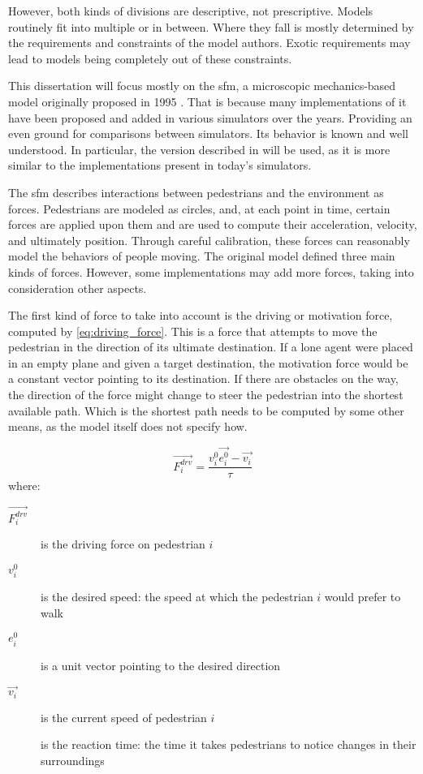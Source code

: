 \documentclass[twoside, 11pt]{article}
\begin{document}
However, both kinds of divisions are descriptive, not prescriptive. Models routinely fit into multiple or in between. Where they fall is mostly determined by the requirements and constraints of the model authors. Exotic requirements may lead to models being completely out of these constraints.

This dissertation will focus mostly on the \gls{sfm}, a microscopic mechanics-based model originally proposed in 1995 \cite{helbingSocialForceModel1995}. That is because many implementations of it have been proposed and added in various simulators over the years. Providing an even ground for comparisons between simulators. Its behavior is known and well understood. In particular, the version described in \cite{helbingSimulatingDynamicFeatures2000} will be used, as it is more similar to the implementations present in today's simulators.

The \gls{sfm} describes interactions between pedestrians and the environment as forces. Pedestrians are modeled as circles, and, at each point in time, certain forces are applied upon them and are used to compute their acceleration, velocity, and ultimately position. Through careful calibration, these forces can reasonably model the behaviors of people moving. The original model defined three main kinds of forces. However, some implementations may add more forces, taking into consideration other aspects.

The first kind of force to take into account is the driving or motivation force, computed by \autoref{eq:driving_force}. This is a force that attempts to move the pedestrian in the direction of its ultimate destination. If a lone agent were placed in an empty plane and given a target destination, the motivation force would be a constant vector pointing to its destination. If there are obstacles on the way, the direction of the force might change to steer the pedestrian into the shortest available path. Which is the shortest path needs to be computed by some other means, as the model itself does not specify how.

\begin{equation}
  \vec{F_i^{drv}} = \frac{v_i^0 \vec{e_i^0} - \vec{v_i}}{\tau}
  \label{eq:driving_force}
\end{equation}
where:
\begin{description}
  \item[$\vec{F_i^{drv}}$] is the driving force on pedestrian $i$
  \item[$v_i^0$] is the desired speed: the speed at which the pedestrian $i$ would prefer to walk
  \item[$e_i^0$] is a unit vector pointing to the desired direction
  \item[$\vec{v_i}$] is the current speed of pedestrian $i$
  \item[\tau] is the reaction time: the time it takes pedestrians to notice changes in their surroundings 
\end{description}
\end{document}
